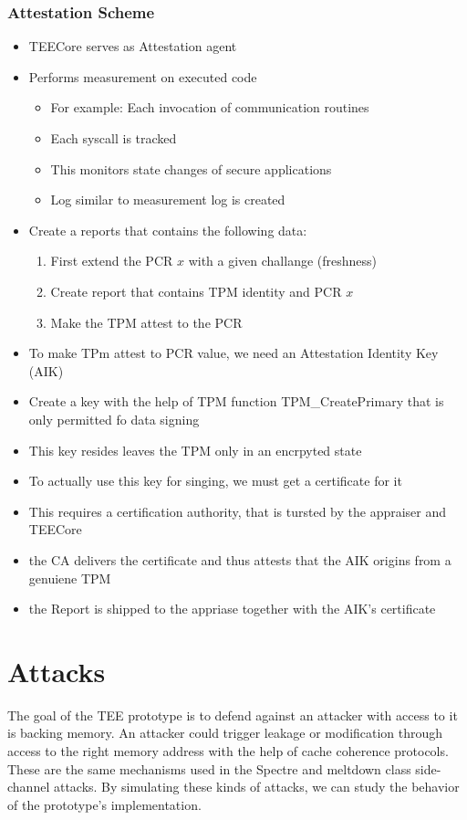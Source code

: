 \subsubsection{Attestation Scheme}
\begin{itemize}
    \item TEECore serves as Attestation agent
    \item Performs measurement on executed code
          \begin{itemize}
              \item For example: Each invocation of communication routines
              \item Each syscall is tracked
              \item This monitors state changes of secure applications
              \item Log similar to measurement log is created
          \end{itemize}
    \item Create a reports that contains the following data:
          \begin{enumerate}
              \item First extend the PCR $x$ with a given challange (freshness)
              \item Create report that contains TPM identity and PCR $x$
              \item Make the TPM attest to the PCR
          \end{enumerate}
    \item To make TPm attest to PCR value, we need an Attestation Identity Key (AIK)
    \item Create a key with the help of TPM function TPM\_CreatePrimary that is only permitted fo data signing
    \item This key resides leaves the TPM only in an encrpyted state
    \item To actually use this key for singing, we must get a certificate for it
    \item This requires a certification authority, that is tursted by the appraiser and TEECore
    \item the CA delivers the certificate and thus attests that the AIK origins from a genuiene TPM
    \item the Report is shipped to the appriase together with the AIK's certificate
\end{itemize}

\section{Attacks}
\label{sec:30:attack}
The goal of the TEE prototype is to defend against an attacker with access to it
is backing memory. An attacker could trigger leakage or modification through
access to the right memory address with the help of cache coherence protocols.
These are the same mechanisms used in the Spectre and meltdown class
side-channel attacks. By simulating these kinds of attacks, we can study the
behavior of the prototype's implementation.\\

